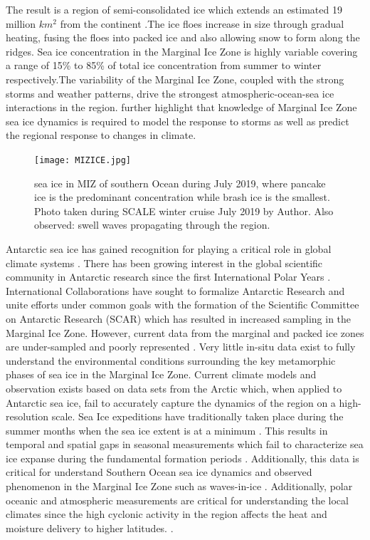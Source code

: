 The result is a region of semi-consolidated ice which extends an estimated 19 million $km^2$ from the continent \cite{MAKSYM2012seaiceextent}.The ice floes increase in size through gradual heating, fusing the floes into packed ice \cite{arrigo2004large} and also allowing snow to form along the ridges. Sea ice concentration in the Marginal Ice Zone is highly variable covering a range of 15\% to 85\% of total ice concentration from summer to winter respectively\cite{alberello2019drift}.The variability of the Marginal Ice Zone, coupled with the strong storms and weather patterns, drive the strongest atmospheric-ocean-sea ice interactions in the region. \textcite{alberello2019drift} further highlight that knowledge of Marginal Ice Zone sea ice dynamics is required to model the response to storms as well as predict the regional response to changes in climate.
\begin{figure}[H]
    \centering
   \texttt{[image: MIZICE.jpg]}
    \caption{sea ice in MIZ of southern Ocean during July 2019, where pancake ice is the predominant  concentration while brash ice is the smallest. Photo taken during SCALE winter cruise July 2019 by Author. Also observed: swell waves propagating through the region.}
    \label{fig:MIZICE}
\end{figure}
Antarctic sea ice has gained recognition for playing a critical role in global climate systems \cite{kennicutt2016delivering}. There has been growing interest in the global scientific community in Antarctic research since the first International Polar Years \cite{kennicutt2016delivering}. International Collaborations have sought to formalize Antarctic Research and unite efforts under common goals \cite{kennicutt2016delivering} with the formation of the Scientific Committee on Antarctic Research (SCAR) which has resulted in increased sampling in the Marginal Ice Zone. However, current data from the marginal and packed ice zones are under-sampled and poorly represented \cite{vichi2019effects}. Very little in-situ data exist to fully understand the environmental conditions surrounding the key metamorphic phases of sea ice in the Marginal Ice Zone. Current climate models and observation exists based on data sets from the Arctic \cite{vichi2019effects} which, when applied to Antarctic sea ice, fail to accurately capture the dynamics of the region on a high-resolution scale. Sea Ice expeditions have traditionally taken place during the summer months when the sea ice extent is at a minimum \cite{kennicutt2016delivering}. This results in temporal and spatial gaps in seasonal measurements which fail to characterize sea ice expanse during the fundamental formation periods \cite{MAKSYM2012seaiceextent} . Additionally, this data is critical for understand Southern Ocean sea ice dynamics and observed phenomenon in the Marginal Ice Zone such as waves-in-ice \cite{kohout2014storm}. Additionally, polar oceanic and atmospheric measurements are critical for understanding the local climates since the high cyclonic activity in the region affects the heat and moisture delivery to higher latitudes. \cite{vichi2019effects}.

